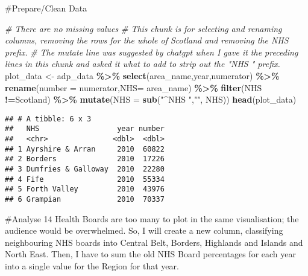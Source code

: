 \documentclass[
]{article}
\newenvironment{Shaded}{\begin{snugshade}}{\end{snugshade}}
\newcommand{\AttributeTok}[1]{\textcolor[rgb]{0.13,0.29,0.53}{#1}}
\newcommand{\CommentTok}[1]{\textcolor[rgb]{0.56,0.35,0.01}{\textit{#1}}}
\newcommand{\FunctionTok}[1]{\textcolor[rgb]{0.13,0.29,0.53}{\textbf{#1}}}
\newcommand{\NormalTok}[1]{#1}
\newcommand{\OtherTok}[1]{\textcolor[rgb]{0.56,0.35,0.01}{#1}}
\newcommand{\SpecialCharTok}[1]{\textcolor[rgb]{0.81,0.36,0.00}{\textbf{#1}}}
\newcommand{\StringTok}[1]{\textcolor[rgb]{0.31,0.60,0.02}{#1}}
\begin{document}
\#Prepare/Clean Data

\begin{Shaded}
\begin{Highlighting}[]
\CommentTok{\# There are no missing values}
\CommentTok{\# This chunk is for selecting and renaming columns, removing the rows for the whole of Scotland and removing the NHS prefix.}
\CommentTok{\# The mutate line was suggested by chatgpt when I gave it the preceding lines in this chunk and asked it what to add to strip out the "NHS " prefix. }
\NormalTok{plot\_data }\OtherTok{\textless{}{-}}\NormalTok{ adp\_data }\SpecialCharTok{\%\textgreater{}\%}
  \FunctionTok{select}\NormalTok{(}\StringTok{\textquotesingle{}area\_name\textquotesingle{}}\NormalTok{,}\StringTok{\textquotesingle{}year\textquotesingle{}}\NormalTok{,}\StringTok{\textquotesingle{}numerator\textquotesingle{}}\NormalTok{) }\SpecialCharTok{\%\textgreater{}\%} 
  \FunctionTok{rename}\NormalTok{(}\AttributeTok{number =} \StringTok{\textquotesingle{}numerator\textquotesingle{}}\NormalTok{,}\AttributeTok{NHS=} \StringTok{\textquotesingle{}area\_name\textquotesingle{}}\NormalTok{) }\SpecialCharTok{\%\textgreater{}\%} 
  \FunctionTok{filter}\NormalTok{(NHS }\SpecialCharTok{!=}\StringTok{\textquotesingle{}Scotland\textquotesingle{}}\NormalTok{) }\SpecialCharTok{\%\textgreater{}\%} 
  \FunctionTok{mutate}\NormalTok{(}\AttributeTok{NHS =} \FunctionTok{sub}\NormalTok{(}\StringTok{"\^{}NHS "}\NormalTok{,}\StringTok{""}\NormalTok{, NHS))}
\FunctionTok{head}\NormalTok{(plot\_data)}
\end{Highlighting}
\end{Shaded}

\begin{verbatim}
## # A tibble: 6 x 3
##   NHS                  year number
##   <chr>               <dbl>  <dbl>
## 1 Ayrshire & Arran     2010  60822
## 2 Borders              2010  17226
## 3 Dumfries & Galloway  2010  22280
## 4 Fife                 2010  55334
## 5 Forth Valley         2010  43976
## 6 Grampian             2010  70337
\end{verbatim}

\#Analyse 14 Health Boards are too many to plot in the same
visualisation; the audience would be overwhelmed. So, I will create a
new column, classifying neighbouring NHS boards into Central Belt,
Borders, Highlands and Islands and North East. Then, I have to sum the
old NHS Board percentages for each year into a single value for the
Region for that year.
\end{document}
